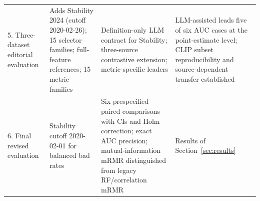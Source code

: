 \documentclass[preprint,12pt]{elsarticle}
\begin{document}
\begin{table}
\begin{threeparttable}
\begin{tabular}{@{}L{22mm}L{42mm}L{54mm}L{54mm}@{}}
5. Three-dataset editorial evaluation & Adds Stability 2024 (cutoff 2020-02-26); 15 selector families; full-feature references; 15 metric families & Definition-only LLM contract for Stability; three-source contrastive extension; metric-specific leaders & LLM-assisted leads five of six AUC cases at the point-estimate level; CLIP subset reproducibility and source-dependent transfer established \\
6. Final revised evaluation & Stability cutoff 2020-02-01 for balanced bad rates & Six prespecified paired comparisons with CIs and Holm correction; exact AUC precision; mutual-information mRMR distinguished from legacy RF/correlation mRMR & Results of Section~\ref{sec:results} \\
\bottomrule
\end{tabular}
\end{threeparttable}
\end{table}
\end{document}
